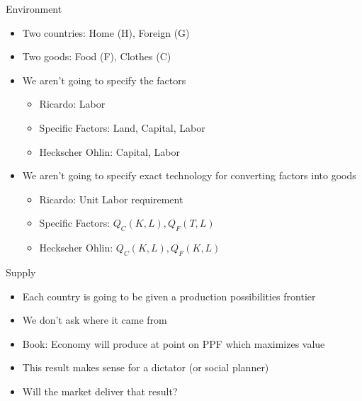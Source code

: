 \documentclass[ignorenonframetext,]{beamer}
\begin{document}
\begin{frame}{Environment}

    \begin{itemize}
        \item Two countries: Home (H), Foreign (G)
        \item Two goods: Food (F), Clothes (C)
        \item We aren't going to specify the factors
        \begin{itemize}
            \item Ricardo: Labor
            \item Specific Factors: Land, Capital, Labor
            \item Heckscher Ohlin: Capital, Labor
        \end{itemize}
        \item We aren't going to specify exact technology for converting factors into goods
        \begin{itemize}
            \item Ricardo: Unit Labor requirement
            \item Specific Factors: $Q_C(K,L), Q_F(T,L)$
            \item Heckscher Ohlin: $Q_C(K,L), Q_F(K,L)$
        \end{itemize}

    \end{itemize}
            
\end{frame}

\begin{frame}{Supply}

    \begin{itemize}
        \item Each country is going to be given a production possibilities frontier
        \item We don't ask where it came from
        \item Book: Economy will produce at point on PPF which maximizes value
        \item This result makes sense for a dictator (or social planner)
        \item Will the market deliver that result?
    \end{itemize}

\end{frame}
\end{document}

